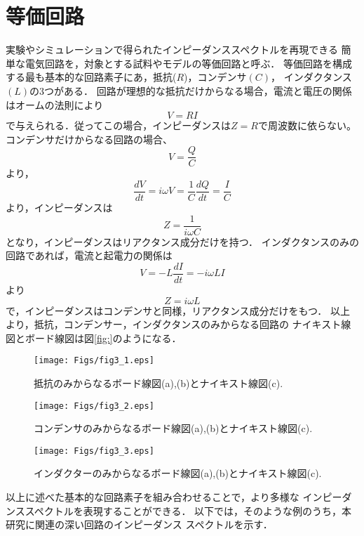 \section{等価回路}
実験やシミュレーションで得られたインピーダンススペクトルを再現できる
簡単な電気回路を，対象とする試料やモデルの等価回路と呼ぶ．
等価回路を構成する最も基本的な回路素子にあ，抵抗($R$)，コンデンサ$(C)$，
インダクタンス$(L)$の3つがある．
回路が理想的な抵抗だけからなる場合，電流と電圧の関係はオームの法則により
\begin{equation}
	V=RI
	\label{eqn:Ohom}
\end{equation}
で与えられる．従ってこの場合，インピーダンスは$Z=R$で周波数に依らない。
コンデンサだけからなる回路の場合、
\begin{equation}
	V=\frac{Q}{C}
	\label{eqn:Q_CV}
\end{equation}
より，
\begin{equation}
	\frac{dV}{dt}=i\omega V =\frac{1}{C}\frac{dQ}{dt}=\frac{I}{C}
	\label{eqn:}
\end{equation}
より，インピーダンスは
\begin{equation}
	Z=\frac{1}{i\omega C}
	\label{eqn:Zc}
\end{equation}
となり，インピーダンスはリアクタンス成分だけを持つ．
インダクタンスのみの回路であれば，電流と起電力の関係は
\begin{equation}
	V=-L\frac{dI}{dt}=-i\omega LI 
	\label{eqn:}
\end{equation}
より
\begin{equation}
	Z=i\omega L
	\label{eqn:}
\end{equation}
で，インピーダンスはコンデンサと同様，リアクタンス成分だけをもつ．
以上より，抵抗，コンデンサー，インダクタンスのみからなる回路の
ナイキスト線図とボード線図は図\ref{fig:}のようになる．
\begin{figure}[h]
	\begin{center}
	\texttt{[image: Figs/fig3\_1.eps]} 
	\end{center}
	\caption{
		抵抗のみからなるボード線図(a),(b)とナイキスト線図(c).
	} 
	\label{fig:fig3_1}
\end{figure}
\begin{figure}[h]
	\begin{center}
	\texttt{[image: Figs/fig3\_2.eps]} 
	\end{center}
	\caption{
		コンデンサのみからなるボード線図(a),(b)とナイキスト線図(c).
	} 
	\label{fig:fig3_2}
\end{figure}
\begin{figure}[h]
	\begin{center}
	\texttt{[image: Figs/fig3\_3.eps]} 
	\end{center}
	\caption{
		インダクターのみからなるボード線図(a),(b)とナイキスト線図(c).
	} 
	\label{fig:fig3_3}
\end{figure}
以上に述べた基本的な回路素子を組み合わせることで，より多様な
インピーダンススペクトルを表現することができる．
以下では，そのような例のうち，本研究に関連の深い回路のインピーダンス
スペクトルを示す．
